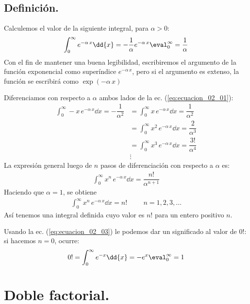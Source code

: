\subsection{Definición.}
Calculemos el valor de la siguiente integral, para $\alpha > 0$:
\begin{align}
\int_{0}^{\infty} e^{-\alpha \, x} \dd{x} = - \dfrac{1}{\alpha} e^{-\alpha \, x}\eval_{0}^{\infty} = \dfrac{1}{\alpha}
\label{eq:ecuacion_02_01}
\end{align}
Con el fin de mantener una buena legibilidad, escribiremos el argumento de la función exponencial como superíndice $e^{-\alpha \, x}$, pero si el argumento es extenso, la función se escribirá como $\exp(-\alpha \, x)$
\par
Diferenciamos con respecto a $\alpha$ ambos lados de la ec. (\ref{eq:ecuacion_02_01}):
\begin{align*}
\int_{0}^{\infty} - x \, e^{-\alpha \, x} \dd{x} = - \dfrac{1}{\alpha^{2}} &= \int_{0}^{\infty} x \, e^{-\alpha \, x} \dd{x} = \dfrac{1}{\alpha^{2}} \\[0.5em]
&= \int_{0}^{\infty} x^{2} \, e^{-\alpha \, x} \dd{x} = \dfrac{2}{\alpha^{3}} \\[0.5em]
&= \int_{0}^{\infty} x^{3} \, e^{-\alpha \, x} \dd{x} = \dfrac{3!}{\alpha^{4}} \\
& \vdots
\end{align*}
La expresión general luego de $n$ pasos de diferenciación con respecto a $\alpha$ es:
\begin{align}
\int_{0}^{\infty} x^{n} \, e^{-\alpha \, x} \dd{x} = \dfrac{n!}{\alpha^{n+1}}
\label{eq:ecuacion_02_02}
\end{align}
Haciendo que $\alpha = 1$, se obtiene
\begin{align}
\int_{0}^{\infty} x^{n} \, e^{-\alpha \, x} \dd{x} = n! \hspace{1cm} n = 1, 2, 3, \ldots
\label{eq:ecuacion_02_03}
\end{align}
Así tenemos una integral definida cuyo valor es $n!$ para un entero positivo $n$.
\par
Usando la ec. (\ref{eq:ecuacion_02_03}) le podemos dar un significado al valor de $0!$: si hacemos $n = 0$, ocurre:
\begin{align}
0! = \int_{0}^{\infty} e^{-x} \dd{x} = -e^{x}\eval_{0}^{\infty} = 1
\label{eq:ecuacion_02_04}
\end{align}
\section{Doble factorial.}
